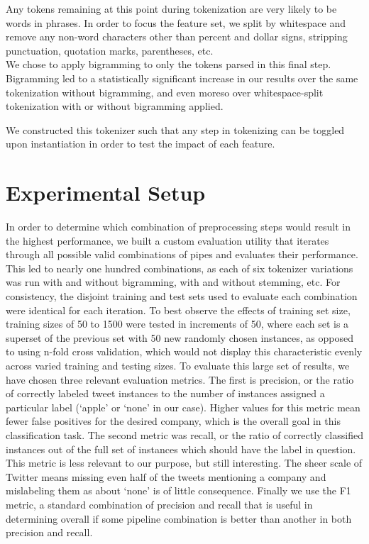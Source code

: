 \documentclass[letterpaper]{article}
\begin{document}
Any tokens remaining at this point during tokenization are very likely to be words in phrases. In order to focus the feature set, we split by whitespace and remove any non-word characters other than percent and dollar signs, stripping punctuation, quotation marks, parentheses, etc. \\

We chose to apply bigramming to only the tokens parsed in this final step. Bigramming led to a statistically significant increase in our results over the same tokenization without bigramming, and even moreso over whitespace-split tokenization with or without bigramming applied.

We constructed this tokenizer such that any step in tokenizing can be toggled upon instantiation in order to test the impact of each feature.\\

\section{Experimental Setup}
In order to determine which combination of preprocessing steps would result in the highest performance, we built a custom evaluation utility that iterates through all possible valid combinations of pipes and evaluates their performance. This led to nearly one hundred combinations, as each of six tokenizer variations was run with and without bigramming, with and without stemming, etc. For consistency, the disjoint training and test sets used to evaluate each combination were identical for each iteration. To best observe the effects of training set size, training sizes of 50 to 1500 were tested in increments of 50, where each set is a superset of the previous set with 50 new randomly chosen instances, as opposed to using n-fold cross validation, which would not display this characteristic evenly across varied training and testing sizes. To evaluate this large set of results, we have chosen three relevant evaluation metrics. The first is precision, or the ratio of correctly labeled tweet instances to the number of instances assigned a particular label (`apple' or `none' in our case). Higher values for this metric mean fewer false positives for the desired company, which is the overall goal in this classification task. The second metric was recall, or the ratio of correctly classified instances out of the full set of instances which should have the label in question. This metric is less relevant to our purpose, but still interesting. The sheer scale of Twitter means missing even half of the tweets mentioning a company and mislabeling them as about `none' is of little consequence. Finally we use the F1 metric, a standard combination of precision and recall that is useful in determining overall if some pipeline combination is better than another in both precision and recall.
\end{document}
